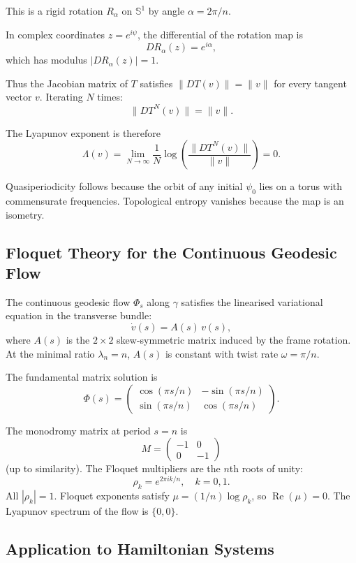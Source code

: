 \documentclass[11pt,a4paper]{article}
\begin{document}
This is a rigid rotation $R_\alpha$ on $\mathbb{S}^1$ by angle $\alpha = 2\pi/n$.

In complex coordinates $z = e^{i\psi}$, the differential of the rotation map is
\[
DR_\alpha(z) = e^{i\alpha},
\]
which has modulus $|DR_\alpha(z)| = 1$.

Thus the Jacobian matrix of $T$ satisfies $\|DT(v)\| = \|v\|$ for every tangent vector $v$. Iterating $N$ times:
\[
\|DT^N(v)\| = \|v\|.
\]

The Lyapunov exponent is therefore
\[
\Lambda(v) = \lim_{N \to \infty} \frac{1}{N} \log \left( \frac{\|DT^N(v)\|}{\|v\|} \right) = 0.
\]

Quasiperiodicity follows because the orbit of any initial $\psi_0$ lies on a torus with commensurate frequencies. Topological entropy vanishes because the map is an isometry.

\subsection{Floquet Theory for the Continuous Geodesic Flow}

The continuous geodesic flow $\Phi_s$ along $\gamma$ satisfies the linearised variational equation in the transverse bundle:
\[
\dot{v}(s) = A(s) \, v(s),
\]
where $A(s)$ is the $2\times 2$ skew-symmetric matrix induced by the frame rotation. At the minimal ratio $\lambda_n = n$, $A(s)$ is constant with twist rate $\omega = \pi/n$.

The fundamental matrix solution is
\[
\Phi(s) = \begin{pmatrix}
\cos(\pi s/n) & -\sin(\pi s/n) \\
\sin(\pi s/n) & \cos(\pi s/n)
\end{pmatrix}.
\]

The monodromy matrix at period $s = n$ is
\[
M = \begin{pmatrix}
-1 & 0 \\
0 & -1
\end{pmatrix}
\]
(up to similarity). The Floquet multipliers are the $n$th roots of unity:
\[
\rho_k = e^{2\pi i k / n}, \quad k=0,1.
\]
All $|\rho_k| = 1$. Floquet exponents satisfy $\mu = (1/n) \log \rho_k$, so $\operatorname{Re}(\mu) = 0$. The Lyapunov spectrum of the flow is $\{0,0\}$.

\subsection{Application to Hamiltonian Systems}
\end{document}
